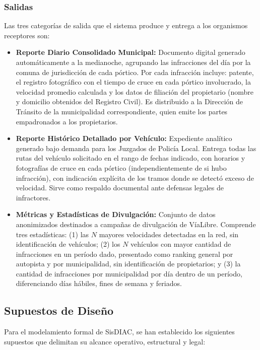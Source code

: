 \documentclass[12pt,letterpaper]{article}
\begin{document}
\subsubsection{Salidas}
Las tres categorías de salida que el sistema produce y entrega a los organismos receptores son:
\begin{itemize}
	\item \textbf{Reporte Diario Consolidado Municipal:} Documento digital generado automáticamente a la medianoche, agrupando las infracciones del día por la comuna de jurisdicción de cada pórtico. Por cada infracción incluye: patente, el registro fotográfico con el tiempo de cruce en cada pórtico involucrado, la velocidad promedio calculada y los datos de filiación del propietario (nombre y domicilio obtenidos del Registro Civil). Es distribuido a la Dirección de Tránsito de la municipalidad correspondiente, quien emite los partes empadronados a los propietarios.
	\item \textbf{Reporte Histórico Detallado por Vehículo:} Expediente analítico generado bajo demanda para los Juzgados de Policía Local. Entrega todas las rutas del vehículo solicitado en el rango de fechas indicado, con horarios y fotografías de cruce en cada pórtico (independientemente de si hubo infracción), con indicación explícita de los tramos donde se detectó exceso de velocidad. Sirve como respaldo documental ante defensas legales de infractores.
	\item \textbf{Métricas y Estadísticas de Divulgación:} Conjunto de datos anonimizados destinados a campañas de divulgación de VíaLibre. Comprende tres estadísticas: (1) las $N$ mayores velocidades detectadas en la red, sin identificación de vehículos; (2) los $N$ vehículos con mayor cantidad de infracciones en un período dado, presentado como ranking general por autopista y por municipalidad, sin identificación de propietarios; y (3) la cantidad de infracciones por municipalidad por día dentro de un período, diferenciando días hábiles, fines de semana y feriados.
\end{itemize}

\newpage
\subsection{Supuestos de Diseño}

Para el modelamiento formal de SisDIAC, se han establecido los siguientes supuestos que delimitan su alcance operativo, estructural y legal:
\end{document}

